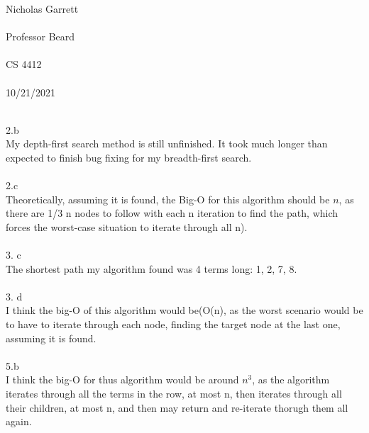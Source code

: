 \documentclass[12pt, a4paper]{article}
\begin{document}
\noindent
Nicholas Garrett\\ \\
Professor Beard\\ \\
CS 4412\\ \\
10/21/2021\\ \\


\begin{center}
\end{center}

\noindent
2.b\\
My depth-first search method is still unfinished.  It took much longer than expected to finish bug fixing for my breadth-first search. \\ \\

2.c\\
Theoretically, assuming it is found, the Big-O for this algorithm should be \( n \), as there are 1/3 n nodes to follow with each n iteration to find the path, which forces the worst-case situation to iterate through all n).\\ \\

3. c\\
 The shortest path my algorithm found was 4 terms long: 1, 2, 7, 8. \\ \\

3. d\\
I think the big-O of this algorithm would be(O(n), as the worst scenario would be to have to iterate through each node, finding the target node at the last one, assuming it is found.  \\ \\

5.b \\
I think the big-O for thus algorithm would be around \(n^3\), as the algorithm iterates through all the terms in the row, at most n, then iterates through all their children, at most n, and then may return and re-iterate thorugh them all again.
\end{document}
